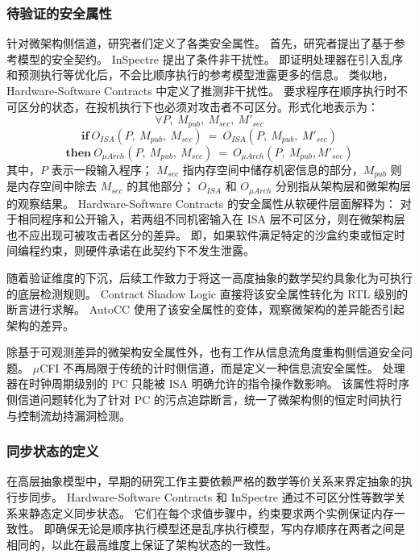\subsubsection{待验证的安全属性}
\label{sec:property}
针对微架构侧信道，研究者们定义了各类安全属性。
首先，研究者提出了基于参考模型的安全契约。
InSpectre\cite{10.1145/3372297.3417246} 提出了条件非干扰性。
即证明处理器在引入乱序和预测执行等优化后，不会比顺序执行的参考模型泄露更多的信息。
类似地，Hardware-Software Contracts\cite{9519500} 中定义了推测非干扰性。
要求程序在顺序执行时不可区分的状态，在投机执行下也必须对攻击者不可区分。形式化地表示为：
$$\forall P,\ M_{pub},\ M_{sec},\ M'_{sec}$$
$$\mathbf{if}\ O_{ISA}(P,\ M_{pub},\ M_{sec})\ =\ O_{ISA}(P,\ M_{pub},\ M'_{sec})$$
$$\mathbf{then}\ O_{\mu Arch}(P,\ M_{pub},\ M_{sec})\ =\ O_{\mu Arch}(P,\ M_{pub}, M'_{sec})$$
其中，$P$ 表示一段输入程序；
$M_{sec}$ 指内存空间中储存机密信息的部分，$M_{pub}$ 则是内存空间中除去 $M_{sec}$ 的其他部分；
$O_{ISA}$ 和 $O_{\mu Arch}$ 分别指从架构层和微架构层的观察结果。 
Hardware-Software Contracts\cite{9519500} 的安全属性从软硬件层面解释为：
对于相同程序和公开输入，若两组不同机密输入在 ISA 层不可区分，则在微架构层也不应出现可被攻击者区分的差异。
即，如果软件满足特定的沙盒约束或恒定时间编程约束，则硬件承诺在此契约下不发生泄露。

随着验证维度的下沉，后续工作致力于将这一高度抽象的数学契约具象化为可执行的底层检测规则。
Contract Shadow Logic\cite{10.1145/3669940.3707243} 直接将该安全属性转化为 RTL 级别的断言进行求解。
AutoCC\cite{10.1145/3613424.3614254} 使用了该安全属性的变体，观察微架构的差异能否引起架构的差异。

除基于可观测差异的微架构安全属性外，也有工作从信息流角度重构侧信道安全问题。
$\mu$CFI\cite{10.1145/3658644.3690344} 不再局限于传统的计时侧信道，而是定义一种信息流安全属性。
处理器在时钟周期级别的 PC 只能被 ISA 明确允许的指令操作数影响。
该属性将时序侧信道问题转化为了针对 PC 的污点追踪断言，统一了微架构侧的恒定时间执行与控制流劫持漏洞检测。


\subsubsection{同步状态的定义}

在高层抽象模型中，早期的研究工作主要依赖严格的数学等价关系来界定抽象的执行步同步。
Hardware-Software Contracts\cite{9519500} 和 InSpectre\cite{10.1145/3372297.3417246} 通过不可区分性等数学关系来静态定义同步状态。
它们在每个求值步骤中，约束要求两个实例保证内存一致性。
即确保无论是顺序执行模型还是乱序执行模型，写内存顺序在两者之间是相同的，以此在最高维度上保证了架构状态的一致性。

